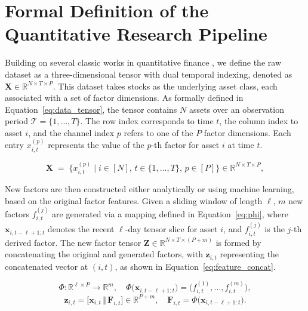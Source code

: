 \documentclass{article}
\begin{document}
\section{Formal Definition of the Quantitative Research Pipeline} \label{app_quant_pipeline_def}
Building on several classic works in quantitative finance \cite{yang2020qlib, li2024master, shi2025alphaforge}, we define the raw dataset as a three-dimensional tensor with dual temporal indexing, denoted as $\mathbf{X}\in\mathbb{R}^{N\times T\times P}$. This dataset takes stocks as the underlying asset class, each associated with a set of factor dimensions. As formally defined in Equation~\eqref{eq:data_tensor}, the tensor contains $N$ assets over an observation period $\mathcal{T}=\{1,\dots,T\}$. The row index corresponds to time $t$, the column index to asset $i$, and the channel index $p$ refers to one of the $P$ factor dimensions. Each entry $x^{(p)}_{i,t}$ represents the value of the $p$-th factor for asset $i$ at time $t$.

\begin{equation}
\mathbf{X}\;=\;\bigl\{x^{(p)}_{i,t}\;\big|\;i\in[N],\,t\in\{1,\dots,T\},\,p\in[P]\bigr\}\in\mathbb{R}^{N\times T\times P},
\label{eq:data_tensor}
\end{equation}

New factors are then constructed either analytically or using machine learning, based on the original factor features. Given a sliding window of length $\ell$, $m$ new factors $f^{(j)}_{i,t}$ are generated via a mapping defined in Equation~\eqref{eq:phi}, where $\mathbf{x}_{i,t-\ell+1:t}$ denotes the recent $\ell$-day tensor slice for asset $i$, and $f^{(j)}_{i,t}$ is the $j$-th derived factor. The new factor tensor $\mathbf{Z}\in\mathbb{R}^{N\times T\times (P+m)}$ is formed by concatenating the original and generated factors, with $\mathbf{z}_{i,t}$ representing the concatenated vector at $(i,t)$, as shown in Equation~\eqref{eq:feature_concat}.

\begin{equation}
\Phi:\mathbb{R}^{\ell\times P}\longrightarrow\mathbb{R}^{m},\quad\Phi\bigl(\mathbf{x}_{i,t-\ell+1:t}\bigr)=\bigl(f^{(1)}_{i,t},\dots,f^{(m)}_{i,t}\bigr),
\label{eq:phi}
\end{equation}
\begin{equation}
\mathbf{z}_{i,t}=\bigl[\mathbf{x}_{i,t}\,\Vert\,\mathbf{F}_{i,t}\bigr]\in\mathbb{R}^{P+m},\quad\mathbf{F}_{i,t}=\Phi\bigl(\mathbf{x}_{i,t-\ell+1:t}\bigr).
\label{eq:feature_concat}
\end{equation}
\end{document}
